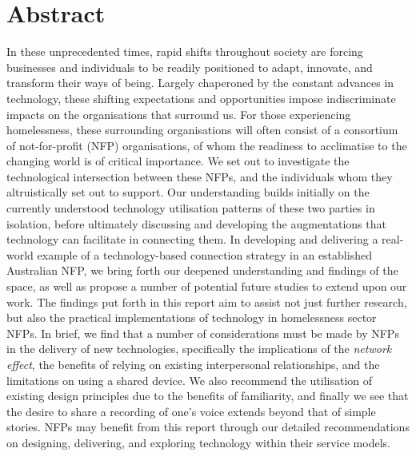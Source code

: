 \chapter{Abstract}

In these unprecedented times, rapid shifts throughout society are forcing businesses and individuals to be readily positioned to adapt, innovate, and transform their ways of being. Largely chaperoned by the constant advances in technology, these shifting expectations and opportunities impose indiscriminate impacts on the organisations that surround us. For those experiencing homelessness, these surrounding organisations will often consist of a consortium of not-for-profit (NFP) organisations, of whom the readiness to acclimatise to the changing world is of critical importance. We set out to investigate the technological intersection between these NFPs, and the individuals whom they altruistically set out to support. Our understanding builds initially on the currently understood technology utilisation patterns of these two parties in isolation, before ultimately discussing and developing the augmentations that technology can facilitate in connecting them. In developing and delivering a real-world example of a technology-based connection strategy in an established Australian NFP, we bring forth our deepened understanding and findings of the space, as well as propose a number of potential future studies to extend upon our work. The findings put forth in this report aim to assist not just further research, but also the practical implementations of technology in homelessness sector NFPs. In brief, we find that a number of considerations must be made by NFPs in the delivery of new technologies, specifically the implications of the \emph{network effect}, the benefits of relying on existing interpersonal relationships, and the limitations on using a shared device. We also recommend the utilisation of existing design principles due to the benefits of familiarity, and finally we see that the desire to share a recording of one's voice extends beyond that of simple stories. NFPs may benefit from this report through our detailed recommendations on designing, delivering, and exploring technology within their service models.